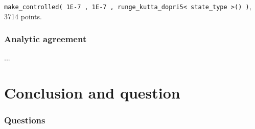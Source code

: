 \documentclass{beamer}
\begin{document}
\begin{frame}
\begin{center}
{\lstinline{make_controlled( 1E-7 , 1E-7 , runge_kutta_dopri5< state_type >() )},  3714 points.
}%
%
\end{center}
\end{frame}

\begin{frame}
\frametitle{Analytic agreement}
...
\end{frame}


\section{Conclusion and question}

\begin{frame}
\frametitle{Questions}
\end{frame}


\end{document}
